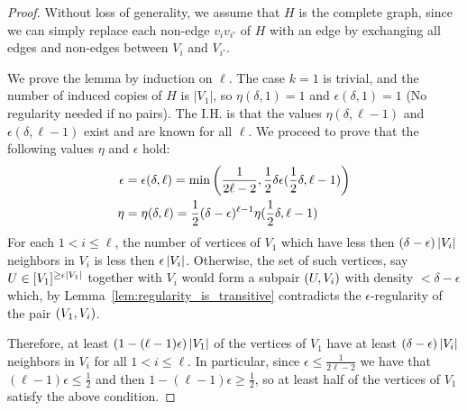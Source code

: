         \begin{proof}
            Without loss of generality, we assume that $H$ is the complete graph, since we can simply replace each non-edge
            $v_i v_{i'}$ of $H$ with an edge by exchanging all edges and non-edges between $V_i$ and $V_{i'}$.

            We prove the lemma by induction on $\ell$.
            The case $k=1$ is trivial, and the number of induced copies of $H$ is $|V_1|$, so $\eta(\delta, 1) = 1$ and
            $\epsilon(\delta, 1) = 1$ (No regularity needed if no pairs).
            The I.H. is that the values $\eta(\delta, \ell-1)$ and $\epsilon(\delta, \ell-1)$ exist and are known for all
            $\ell$.
            We proceed to prove that the following values $\eta$ and $\epsilon$ hold:
            \begin{align*}
                \epsilon &= \epsilon(\delta, \ell)
                    = \min \left( \frac{1}{2\ell - 2}, \frac{1}{2} \delta \epsilon(\frac{1}{2}\delta, \ell-1) \right) \\
                \eta &= \eta(\delta, \ell)
                    = \frac{1}{2} (\delta - \epsilon)^{\ell-1} \eta(\frac{1}{2}\delta, \ell-1)
            \end{align*}
            For each $1 < i \leq \ell$, the number of vertices of $V_1$ which have less then
            $(\delta - \epsilon) \left| V_i \right|$ neighbors in $V_i$ is less then $\epsilon \left| V_i \right|$.
            Otherwise, the set of such vertices, say $U \in [V_1]^{\geq \epsilon \left| V_1 \right|}$ together with $V_i$
            would form a subpair $\left( U, V_i \right)$ with density $< \delta - \epsilon$ which, by
            Lemma~\ref{lem:regularity_is_transitive} contradicts the $\epsilon$-regularity of the pair $\left( V_1, V_i \right)$.

            Therefore, at least $(1 - (\ell -1) \epsilon) \left| V_1 \right|$ of the vertices of $V_1$ have at least
            $(\delta - \epsilon) \left| V_i \right|$ neighbors in $V_i$ for all $1 < i \leq \ell$.
            In particular, since $\epsilon \leq \frac{1}{2\ell - 2}$ we have that $(\ell - 1) \epsilon \leq \frac{1}{2}$
            and then $1 - (\ell - 1) \epsilon \geq \frac{1}{2}$, so at least half of the vertices of $V_1$ satisfy the
            above condition.


\end{proof}
